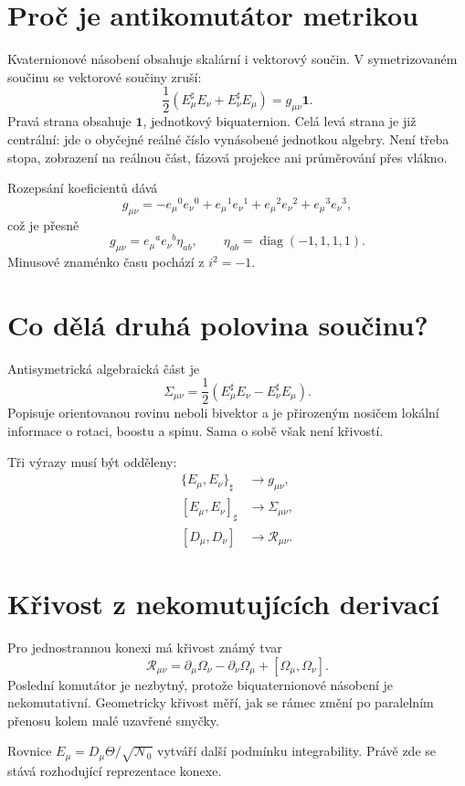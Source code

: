 \section{Proč je antikomutátor metrikou}
Kvaternionové násobení obsahuje skalární i vektorový součin. V
symetrizovaném součinu se vektorové součiny zruší:
\[
 \boxed{
 \frac12\left(E_\mu^\sharp E_\nu+E_\nu^\sharp E_\mu\right)
 =g_{\mu\nu}\mathbf1.}
\]
Pravá strana obsahuje $\mathbf1$, jednotkový biquaternion. Celá levá strana
je již centrální: jde o obyčejné reálné číslo vynásobené jednotkou
algebry. Není třeba stopa, zobrazení na reálnou část, fázová projekce ani
průměrování přes vlákno.

Rozepsání koeficientů dává
\[
 g_{\mu\nu}
 =-e_\mu{}^0e_\nu{}^0+
  e_\mu{}^1e_\nu{}^1+
  e_\mu{}^2e_\nu{}^2+
  e_\mu{}^3e_\nu{}^3,
\]
což je přesně
\[
 g_{\mu\nu}=e_\mu{}^a e_\nu{}^b\eta_{ab},
 \qquad \eta_{ab}=\operatorname{diag}(-1,1,1,1).
\]
Minusové znaménko času pochází z $i^2=-1$.

\section{Co dělá druhá polovina součinu?}
Antisymetrická algebraická část je
\[
 \Sigma_{\mu\nu}
 =\frac12\left(E_\mu^\sharp E_\nu-E_\nu^\sharp E_\mu\right).
\]
Popisuje orientovanou rovinu neboli bivektor a je přirozeným nosičem lokální
informace o rotaci, boostu a spinu. Sama o sobě však není křivostí.

Tři výrazy musí být odděleny:
\begin{align*}
 \{E_\mu,E_\nu\}_\sharp
 &\longrightarrow g_{\mu\nu},\\
 [E_\mu,E_\nu]_\sharp
 &\longrightarrow \Sigma_{\mu\nu},\\
 [D_\mu,D_\nu]
 &\longrightarrow \mathcal R_{\mu\nu}.
\end{align*}

\section{Křivost z nekomutujících derivací}
Pro jednostrannou konexi má křivost známý tvar
\[
 \mathcal R_{\mu\nu}
 =\partial_\mu\Omega_\nu-\partial_\nu\Omega_\mu
  +[\Omega_\mu,\Omega_\nu].
\]
Poslední komutátor je nezbytný, protože biquaternionové násobení je
nekomutativní. Geometricky křivost měří, jak se rámec změní po paralelním
přenosu kolem malé uzavřené smyčky.

Rovnice $E_\mu=D_\mu\Theta/\sqrt{\mathcal N_0}$ vytváří další podmínku
integrability. Právě zde se stává rozhodující reprezentace konexe.

